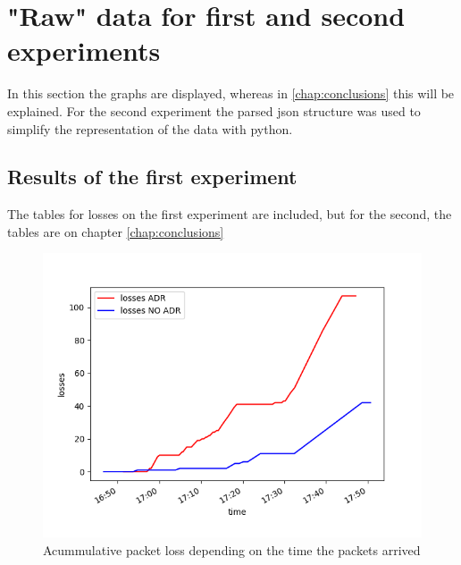 \chapter{"Raw" data for first and second experiments}
\label{chap:fifth}
\ifpdf
    \graphicspath{{Chapter5/Figures/PNG/}{Chapter5/Figures/PDF/}{Chapter5/Figures/}}
\else
    \graphicspath{{Chapter5/Figures/EPS/}{Chapter5/Figures/}}
\fi

In this section the graphs are displayed, whereas in \ref{chap:conclusions} this will be 
explained. For the second experiment the parsed json structure was used to simplify the 
representation of the data with python.
\section{Results of the first experiment}
The tables for losses on the first experiment are included, but for the second, the tables are on 
 chapter \ref{chap:conclusions} \\
\begin{figure}[htbp]

    \includegraphics[width=\linewidth]{losses.png}
    \caption{Acummulative packet loss depending on the time the packets arrived}
    \label{chap:fifth:fig:1}
\end{figure}

